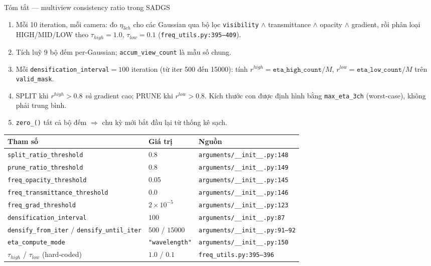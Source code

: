 \begin{frame}{Tóm tắt --- multiview consistency ratio trong SADGS}
\footnotesize
\begin{enumerate}\itemsep2pt
  \item Mỗi 10 iteration, mỗi camera: đo $\eta_{3ch}$ cho các Gaussian qua bộ lọc \texttt{visibility} $\wedge$ transmittance $\wedge$ opacity $\wedge$ gradient, rồi phân loại HIGH/MID/LOW theo $\tau_{high}=1.0$, $\tau_{low}=0.1$ (\texttt{freq\_utils.py:395--409}).
  \item Tích luỹ 9 bộ đếm per-Gaussian; \texttt{accum\_view\_count} là mẫu số chung.
  \item Mỗi \texttt{densification\_interval}$=100$ iteration (từ iter 500 đến 15000): tính
        $r^{high}=\texttt{eta\_high\_count}/M$, $r^{low}=\texttt{eta\_low\_count}/M$ trên \texttt{valid\_mask}.
  \item SPLIT khi $r^{high}>0.8$ \emph{và} gradient cao; PRUNE khi $r^{low}>0.8$. Kích thước con được định hình bằng \texttt{max\_eta\_3ch} (worst-case), không phải trung bình.
  \item \texttt{zero\_()} tất cả bộ đếm $\Rightarrow$ chu kỳ mới bắt đầu lại từ thống kê sạch.
\end{enumerate}
\begin{center}
\scriptsize
\begin{tabular}{lll}
\hline
\textbf{Tham số} & \textbf{Giá trị} & \textbf{Nguồn} \\
\hline
\texttt{split\_ratio\_threshold} & $0.8$ & \texttt{arguments/\_\_init\_\_.py:148} \\
\texttt{prune\_ratio\_threshold} & $0.8$ & \texttt{arguments/\_\_init\_\_.py:149} \\
\texttt{freq\_opacity\_threshold} & $0.05$ & \texttt{arguments/\_\_init\_\_.py:145} \\
\texttt{freq\_transmittance\_threshold} & $0.0$ & \texttt{arguments/\_\_init\_\_.py:146} \\
\texttt{freq\_grad\_threshold} & $2\times10^{-5}$ & \texttt{arguments/\_\_init\_\_.py:123} \\
\texttt{densification\_interval} & $100$ & \texttt{arguments/\_\_init\_\_.py:87} \\
\texttt{densify\_from\_iter} / \texttt{densify\_until\_iter} & $500$ / $15000$ & \texttt{arguments/\_\_init\_\_.py:91--92} \\
\texttt{eta\_compute\_mode} & \texttt{"wavelength"} & \texttt{arguments/\_\_init\_\_.py:150} \\
$\tau_{high}$ / $\tau_{low}$ (hard-coded) & $1.0$ / $0.1$ & \texttt{freq\_utils.py:395--396} \\
\hline
\end{tabular}
\end{center}
\end{frame}
